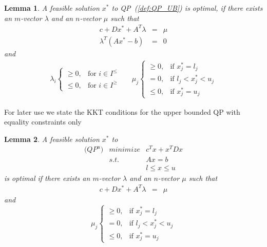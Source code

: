 \documentclass[a4paper]{article}
\newtheorem{lemma}{Lemma}
\begin{document}
\begin{lemma}
A feasible solution $x^{*}$ to QP~(\ref{def:QP_UB}) is optimal, if there exists an $m$-vector $\lambda$ and an $n$-vector $\mu$ such that 
\begin{eqnarray}
c + Dx^{*} +A^{T}\lambda
&=&
\mu  \\
\lambda^{T}\left(Ax^{*}-b\right)
&=&
0
\end{eqnarray}
and
\begin{eqnarray}
\label{def:mu_opt_cond}
\lambda_{i} \left\{
\begin{array}{ll}
\geq 0, & \text{for $i \in I^{\leq}$} \\
\leq 0, & \text{for $i \in I^{\geq}$}
\end{array}
\right.
&&
\mu_{j} \left\{
\begin{array}{ll}
\geq 0, & \text{if $x_{j}^{*}=l_{j}$} \\
= 0,    & \text{if $l_{j} < x_{j}^{*} < u_{j}$} \\
\leq 0, & \text{if $x_{j}^{*}=u_{j}$}
\end{array}
\right.
\end{eqnarray}
\end{lemma}
For later use we state the KKT conditions for the upper bounded QP with equality constraints only
\begin{lemma}
\label{lem:KKT_QP_UB_eq}
A feasible solution $x^{*}$ to
\begin{eqnarray}
  \mbox{($QP^{u}$)} &minimize& c^{T}x +x^{T}Dx
\nonumber      \\
\label{eq:QP_UB_eq_feas_cons}
    & s.t. & Ax = b  \\
\label{eq:QP_UB_eq_var_feas_cons}
    & & l \leq x \leq u  
\end{eqnarray}
is optimal if there exists an $m$-vector $\lambda$ and an $n$-vector $\mu$ such
that
\begin{eqnarray}
c + Dx^{*} +A^{T}\lambda
&=&
\mu  
\end{eqnarray}
and
\begin{equation}
\label{eq:KKT_QP_UB_eq_mu_cond}
\mu_{j} \left\{
\begin{array}{ll}
\geq 0, & \text{if $x_{j}^{*}=l_{j}$} \\
= 0,    & \text{if $l_{j} < x_{j}^{*} < u_{j}$} \\
\leq 0, & \text{if $x_{j}^{*}=u_{j}$}
\end{array}
\right.
\end{equation} 
\end{lemma}
\end{document}

